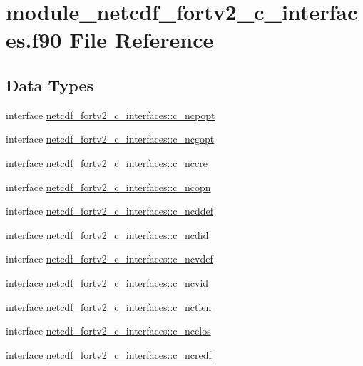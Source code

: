 \hypertarget{module__netcdf__fortv2__c__interfaces_8f90}{}\section{module\+\_\+netcdf\+\_\+fortv2\+\_\+c\+\_\+interfaces.\+f90 File Reference}
\label{module__netcdf__fortv2__c__interfaces_8f90}
\subsection*{Data Types}
\begin{DoxyCompactItemize}
\item 
interface \hyperlink{interfacenetcdf__fortv2__c__interfaces_1_1c__ncpopt}{netcdf\+\_\+fortv2\+\_\+c\+\_\+interfaces\+::c\+\_\+ncpopt}
\item 
interface \hyperlink{interfacenetcdf__fortv2__c__interfaces_1_1c__ncgopt}{netcdf\+\_\+fortv2\+\_\+c\+\_\+interfaces\+::c\+\_\+ncgopt}
\item 
interface \hyperlink{interfacenetcdf__fortv2__c__interfaces_1_1c__nccre}{netcdf\+\_\+fortv2\+\_\+c\+\_\+interfaces\+::c\+\_\+nccre}
\item 
interface \hyperlink{interfacenetcdf__fortv2__c__interfaces_1_1c__ncopn}{netcdf\+\_\+fortv2\+\_\+c\+\_\+interfaces\+::c\+\_\+ncopn}
\item 
interface \hyperlink{interfacenetcdf__fortv2__c__interfaces_1_1c__ncddef}{netcdf\+\_\+fortv2\+\_\+c\+\_\+interfaces\+::c\+\_\+ncddef}
\item 
interface \hyperlink{interfacenetcdf__fortv2__c__interfaces_1_1c__ncdid}{netcdf\+\_\+fortv2\+\_\+c\+\_\+interfaces\+::c\+\_\+ncdid}
\item 
interface \hyperlink{interfacenetcdf__fortv2__c__interfaces_1_1c__ncvdef}{netcdf\+\_\+fortv2\+\_\+c\+\_\+interfaces\+::c\+\_\+ncvdef}
\item 
interface \hyperlink{interfacenetcdf__fortv2__c__interfaces_1_1c__ncvid}{netcdf\+\_\+fortv2\+\_\+c\+\_\+interfaces\+::c\+\_\+ncvid}
\item 
interface \hyperlink{interfacenetcdf__fortv2__c__interfaces_1_1c__nctlen}{netcdf\+\_\+fortv2\+\_\+c\+\_\+interfaces\+::c\+\_\+nctlen}
\item 
interface \hyperlink{interfacenetcdf__fortv2__c__interfaces_1_1c__ncclos}{netcdf\+\_\+fortv2\+\_\+c\+\_\+interfaces\+::c\+\_\+ncclos}
\item 
interface \hyperlink{interfacenetcdf__fortv2__c__interfaces_1_1c__ncredf}{netcdf\+\_\+fortv2\+\_\+c\+\_\+interfaces\+::c\+\_\+ncredf}

\end{DoxyCompactItemize}
